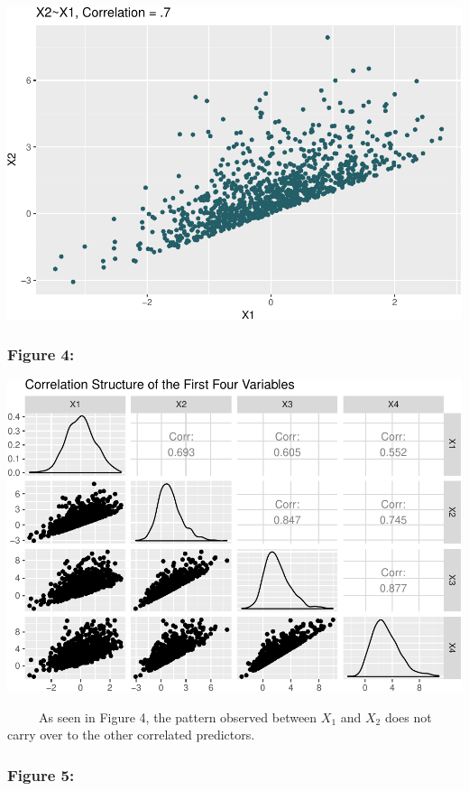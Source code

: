 \documentclass[12pt,twoside]{reedthesis}
\begin{document}
  \begin{center}\includegraphics{Thesis_files/figure-latex/fig3-1} \end{center}
  
  \subsubsection{Figure 4:}\label{figure-4}
  
  \begin{center}\includegraphics{Thesis_files/figure-latex/fig4-1} \end{center}
  
  ~~~~~As seen in Figure 4, the pattern observed between \(X_1\) and
  \(X_2\) does not carry over to the other correlated predictors.
  
  \subsubsection{Figure 5:}\label{figure-5}
  
\end{document}
